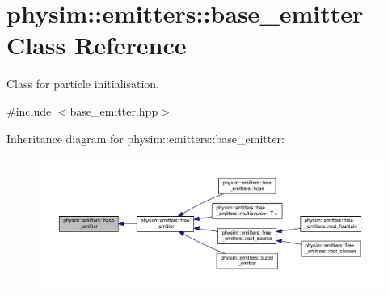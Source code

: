 \hypertarget{classphysim_1_1emitters_1_1base__emitter}{}\section{physim\+:\+:emitters\+:\+:base\+\_\+emitter Class Reference}
\label{classphysim_1_1emitters_1_1base__emitter}


Class for particle initialisation.  




{\ttfamily \#include $<$base\+\_\+emitter.\+hpp$>$}



Inheritance diagram for physim\+:\+:emitters\+:\+:base\+\_\+emitter\+:\nopagebreak
\begin{figure}[H]
\begin{center}
\leavevmode
\includegraphics[width=350pt]{classphysim_1_1emitters_1_1base__emitter__inherit__graph}
\end{center}
\end{figure}
